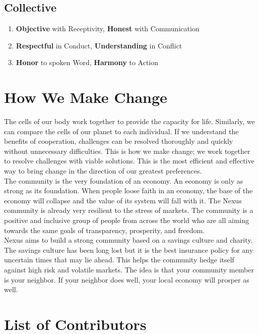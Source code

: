 \documentclass[11pt]{article}
\begin{document}
\subsection{Collective}

\begin{enumerate}
\item \textbf{Objective} with Receptivity, \textbf{Honest} with Communication
\item \textbf{Respectful} in Conduct, \textbf{Understanding} in Conflict
\item \textbf{Honor} to spoken Word, \textbf{Harmony} to Action
\end{enumerate}

\section{How We Make Change}

The cells of our body work together to provide the capacity for life. Similarly, we can compare the cells of our planet to each individual. 
If we understand the benefits of cooperation, challenges can be resolved thoroughly and quickly without unnecessary difficulties.
This is how we make change; we work together to resolve challenges with viable solutions.
This is the most efficient and effective way to bring change in the direction of our greatest preferences.\\

\noindent The community is the very foundation of an economy. An economy is only as strong as its foundation. 
When people loose faith in an economy, the base of the economy will collapse and the value of its system will fall with it. 
The Nexus community is already very resilient to the stress of markets. The community is a positive and inclusive group of people from across the world who are all aiming towards the same goals of transparency, prosperity, and freedom.\\ 

\noindent Nexus aims to build a strong community based on a savings culture and charity. 
The savings culture has been long lost but it is the best insurance policy for any uncertain times that may lie ahead. 
This helps the community hedge itself against high risk and volatile markets.
The idea is that your community member is your neighbor. If your neighbor does well, your local economy will prosper as well. 

\section{List of Contributors}
\end{document}
